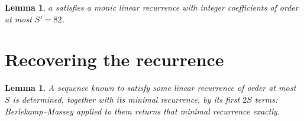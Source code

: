 \documentclass[11pt,a4paper]{article}
\theoremstyle{plain}
\newtheorem{lemma}[theorem]{Lemma}
\theoremstyle{definition}
\begin{document}
\begin{lemma}\label{lem:cf}
$a$ satisfies a monic linear recurrence with integer coefficients of order at most
$S'=82$.
\end{lemma}

\section{Recovering the recurrence}

\begin{lemma}\label{lem:bm}
A sequence known to satisfy some linear recurrence of order at most $S$ is determined, together
with its minimal recurrence, by its first $2S$ terms: Berlekamp--Massey applied to them returns
that minimal recurrence exactly.
\end{lemma}
\end{document}
